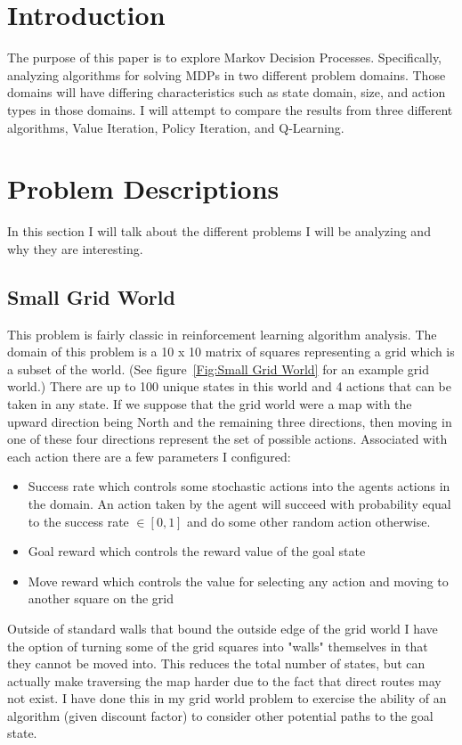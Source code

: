 \documentclass[11pt]{article}
\newcommand{\problemone}{Small Grid World}
\begin{document}
    \thispagestyle{firstpage}


    \section{Introduction}\label{sec:introduction}
    The purpose of this paper is to explore Markov Decision Processes.
    Specifically, analyzing algorithms for solving MDPs in two different problem domains.
    Those domains will have differing characteristics such as state domain, size, and action types in those domains.
    I will attempt to compare the results from three different algorithms, Value Iteration, Policy Iteration, and Q-Learning.


    \section{Problem Descriptions}
    In this section I will talk about the different problems I will be analyzing and why they are interesting.

    \subsection{\problemone}
    This problem is fairly classic in reinforcement learning algorithm analysis.
    The domain of this problem is a 10 x 10 matrix of squares representing a grid which is a subset of the world.
    (See figure~\ref{Fig:Small Grid World} for an example grid world.)
    There are up to 100 unique states in this world and 4 actions that can be taken in any state.
    If we suppose that the grid world were a map with the upward direction being North and the remaining three directions,
    then moving in one of these four directions represent the set of possible actions.
    Associated with each action there are a few parameters I configured:
    \begin{itemize}
        \item Success rate which controls some stochastic actions into the agents actions in the domain. An action taken by the agent will succeed with probability equal to the success rate $\in [0,1]$ and do some other random action otherwise.
        \item Goal reward which controls the reward value of the goal state
        \item Move reward which controls the value for selecting any action and moving to another square on the grid
    \end{itemize}
    Outside of standard walls that bound the outside edge of the grid world I have the option of turning some of the grid
    squares into "walls" themselves in that they cannot be moved into.
    This reduces the total number of states, but can actually make traversing the map harder due to the fact that direct
    routes may not exist.
    I have done this in my grid world problem to exercise the ability of an algorithm (given discount factor) to consider
    other potential paths to the goal state.
\end{document}
